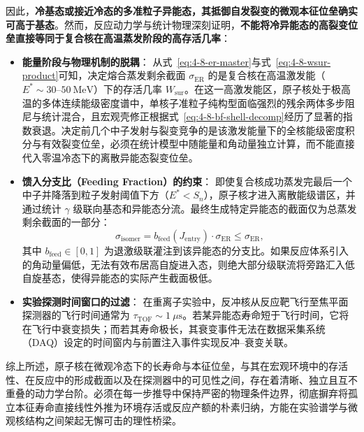 因此，\textbf{冷基态或接近冷态的多准粒子异能态，其抵御自发裂变的微观本征位垒确实可高于基态}。然而，反应动力学与统计物理深刻证明，\textbf{不能将冷异能态的高裂变位垒直接等同于复合核在高温蒸发阶段的高存活几率}：
\begin{itemize}
\item \textbf{能量阶段与物理机制的脱耦}：
从式~\eqref{eq:4-8-er-master}与式~\eqref{eq:4-8-wsur-product}可知，决定熔合蒸发剩余截面 $\sigma_{\mathrm{ER}}$ 的是复合核在高温激发能（$E^* \sim 30$--$50\ \mathrm{MeV}$）下的存活几率 $W_{\mathrm{sur}}$。在这一高激发能区，原子核处于极高温的多体连续能级密度谱中，单核子准粒子纯构型面临强烈的残余两体多步阻尼与统计混合，且宏观壳修正根据式~\eqref{eq:4-8-bf-shell-decomp}经历了显著的指数衰退。决定前几个中子发射与裂变竞争的是该激发能量下的全核能级密度积分与有效裂变位垒，必须在统计模型中随能量和角动量独立计算，而不能直接代入零温冷态下的离散异能态裂变位垒。
\item \textbf{馈入分支比（Feeding Fraction）的约束}：
即使复合核成功蒸发完最后一个中子并降落到粒子发射阈值下方（$E^* < S_n$），原子核才进入离散能级谱区，并通过统计 $\gamma$ 级联向基态和异能态分流。最终生成特定异能态的截面仅为总蒸发剩余截面的一部分：
\begin{equation}\label{eq:4-8-isomer-feeding-frac}
\sigma_{\mathrm{isomer}} = b_{\mathrm{feed}}(J_{\mathrm{entry}}) \cdot \sigma_{\mathrm{ER}} \le \sigma_{\mathrm{ER}},
\end{equation}
其中 $b_{\mathrm{feed}} \in [0, 1]$ 为退激级联灌注到该异能态的分支比。如果反应体系引入的角动量偏低，无法有效布居高自旋进入态，则绝大部分级联流将旁路汇入低自旋基态，使得异能态的实际产生截面极低。
\item \textbf{实验探测时间窗口的过滤}：
在重离子实验中，反冲核从反应靶飞行至焦平面探测器的飞行时间通常为 $\tau_{\mathrm{TOF}} \sim 1\ \mu\mathrm{s}$。若某异能态寿命短于飞行时间，它将在飞行中衰变损失；而若其寿命极长，其衰变事件无法在数据采集系统（DAQ）设定的时间窗内与前置注入事件实现反冲--衰变关联。
\end{itemize}

综上所述，原子核在微观冷态下的长寿命与本征位垒，与其在宏观环境中的存活性、在反应中的形成截面以及在探测器中的可见性之间，存在着清晰、独立且互不重叠的动力学台阶。必须在每一步推导中保持严密的物理条件边界，彻底摒弃将孤立本征寿命直接线性外推为环境存活或反应产额的朴素归纳，方能在实验谱学与微观核结构之间架起无懈可击的理性桥梁。
